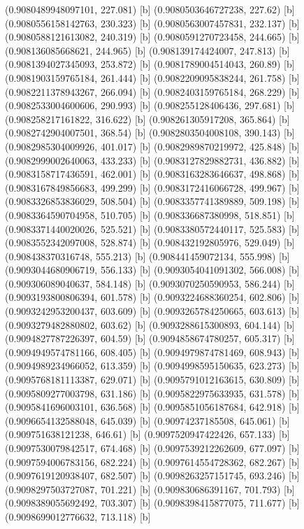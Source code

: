 {{{(0.9080489948097101, 227.081) [b] 
(0.9080503646727238, 227.62) [b] 
(0.9080556158142763, 230.323) [b] 
(0.9080563007457831, 232.137) [b] 
(0.9080588121613082, 240.319) [b] 
(0.9080591270723458, 244.665) [b] 
(0.908136085668621, 244.965) [b] 
(0.908139174424007, 247.813) [b] 
(0.9081394027345093, 253.872) [b] 
(0.9081789004514043, 260.89) [b] 
(0.9081903159765184, 261.444) [b] 
(0.9082209095838244, 261.758) [b] 
(0.9082211378943267, 266.094) [b] 
(0.9082403159765184, 268.229) [b] 
(0.9082533004600606, 290.993) [b] 
(0.908255128406436, 297.681) [b] 
(0.908258217161822, 316.622) [b] 
(0.908261305917208, 365.864) [b] 
(0.9082742904007501, 368.54) [b] 
(0.9082803504008108, 390.143) [b] 
(0.9082985304009926, 401.017) [b] 
(0.9082989870219972, 425.848) [b] 
(0.9082999002640063, 433.233) [b] 
(0.9083127829882731, 436.882) [b] 
(0.9083158717436591, 462.001) [b] 
(0.9083163283646637, 498.868) [b] 
(0.9083167849856683, 499.299) [b] 
(0.9083172416066728, 499.967) [b] 
(0.9083326853836029, 508.504) [b] 
(0.9083357741389889, 509.198) [b] 
(0.9083364590704958, 510.705) [b] 
(0.908336687380998, 518.851) [b] 
(0.9083371440020026, 525.521) [b] 
(0.9083380572440117, 525.583) [b] 
(0.9083552342097008, 528.874) [b] 
(0.908432192805976, 529.049) [b] 
(0.908438370316748, 555.213) [b] 
(0.908441459072134, 555.998) [b] 
(0.9093044680906719, 556.133) [b] 
(0.9093054041091302, 566.008) [b] 
(0.909306089040637, 584.148) [b] 
(0.9093070250590953, 586.244) [b] 
(0.9093193800806394, 601.578) [b] 
(0.9093224688360254, 602.806) [b] 
(0.9093242953200437, 603.609) [b] 
(0.9093265784250665, 603.613) [b] 
(0.9093279482880802, 603.62) [b] 
(0.9093288615300893, 604.144) [b] 
(0.9094827787226397, 604.59) [b] 
(0.9094858674780257, 605.317) [b] 
(0.9094949574781166, 608.405) [b] 
(0.9094979874781469, 608.943) [b] 
(0.9094989234966052, 613.359) [b] 
(0.9094998595150635, 623.273) [b] 
(0.9095768181113387, 629.071) [b] 
(0.9095791012163615, 630.809) [b] 
(0.9095809277003798, 631.186) [b] 
(0.9095822975633935, 631.578) [b] 
(0.9095841696003101, 636.568) [b] 
(0.9095851056187684, 642.918) [b] 
(0.9096654132588048, 645.039) [b] 
(0.90974237185508, 645.061) [b] 
(0.909751638121238, 646.61) [b] 
(0.9097520947422426, 657.133) [b] 
(0.9097530079842517, 674.468) [b] 
(0.9097539212262609, 677.097) [b] 
(0.9097594006783156, 682.224) [b] 
(0.9097614554728362, 682.267) [b] 
(0.9097619120938407, 682.507) [b] 
(0.9098263257151745, 693.246) [b] 
(0.9098297503727087, 701.221) [b] 
(0.909830686391167, 701.793) [b] 
(0.9098389055692492, 703.307) [b] 
(0.9098398415877075, 711.677) [b] 
(0.9098699012776632, 713.118) [b] 
}}}
